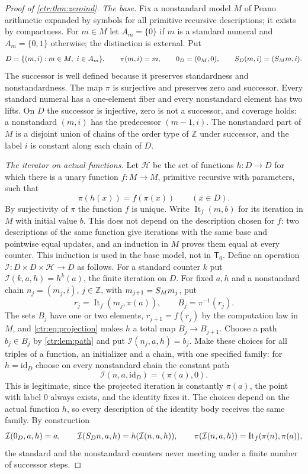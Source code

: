 \begin{proof}[Proof of \cref{ctr:thm:zeroind}]
\emph{The base.} Fix a nonstandard model $M$ of Peano arithmetic expanded by symbols for all
primitive recursive descriptions; it exists by compactness. For $m\in M$ let $A_m=\{0\}$ if
$m$ is a standard numeral and $A_m=\{0,1\}$ otherwise; the distinction is external. Put
\[
 D=\{(m,i): m\in M,\ i\in A_m\},\qquad \pi(m,i)=m,\qquad
 0_D=(0_M,0),\qquad S_D(m,i)=(S_Mm,i).
\]
The successor is well defined because it preserves standardness and nonstandardness. The
map $\pi$ is surjective and preserves zero and successor. Every standard numeral has a
one-element fiber and every nonstandard element has two lifts. On $D$ the successor is
injective, zero is not a successor, and coverage holds: a nonstandard $(m,i)$ has the
predecessor $(m-1,i)$. The nonstandard part of $M$ is a disjoint union of chains of the
order type of $\mathbb Z$ under successor, and the label $i$ is constant along each chain
of $D$.

\emph{The iterator on actual functions.} Let $\mathscr H$ be the set of functions
$h\colon D\to D$ for which there is a unary function $f\colon M\to M$, primitive recursive
with parameters, such that
\begin{equation}\label{ctr:eq:projection}
 \pi(h(x))=f(\pi(x))\qquad(x\in D).
\end{equation}
By surjectivity of $\pi$ the function $f$ is unique. Write
$\operatorname{It}_f(m,b)$ for its iteration in $M$ with initial value $b$. This does not
depend on the description chosen for $f$: two descriptions of the same function give
iterations with the same base and pointwise equal updates, and an induction in $M$ proves
them equal at every counter. This induction is used in the base model, not in
$\mathsf T_0$. Define an operation
$\mathcal I\colon D\times D\times\mathscr H\to D$ as follows. For a standard counter $k$
put $\mathcal I(k,a,h)=h^k(a)$, the finite iteration on $D$. For fixed $a,h$ and a
nonstandard chain $n_j=(m_j,i)$, $j\in\mathbb Z$, with $m_{j+1}=S_Mm_j$, put
\[
 r_j=\operatorname{It}_f(m_j,\pi(a)),\qquad B_j=\pi^{-1}(r_j).
\]
The sets $B_j$ have one or two elements, $r_{j+1}=f(r_j)$ by the computation law in $M$,
and \eqref{ctr:eq:projection} makes $h$ a total map $B_j\to B_{j+1}$. Choose a path
$b_j\in B_j$ by \cref{ctr:lem:path} and put $\mathcal I(n_j,a,h)=b_j$. Make these choices
for all triples of a function, an initializer and a chain, with one specified family: for
$h=\mathrm{id}_D$ choose on every nonstandard chain the constant path
\begin{equation}\label{ctr:eq:idchoice}
 \mathcal I(n,a,\mathrm{id}_D)=(\pi(a),0).
\end{equation}
This is legitimate, since the projected iteration is constantly $\pi(a)$, the point with
label $0$ always exists, and the identity fixes it. The choices depend on the actual
function $h$, so every description of the identity body receives the same family. By
construction
\[
 \mathcal I(0_D,a,h)=a,\qquad \mathcal I(S_Dn,a,h)=h(\mathcal I(n,a,h)),\qquad
 \pi(\mathcal I(n,a,h))=\operatorname{It}_f(\pi(n),\pi(a)),
\]
the standard and the nonstandard counters never meeting under a finite number of successor
steps.


\end{proof}
